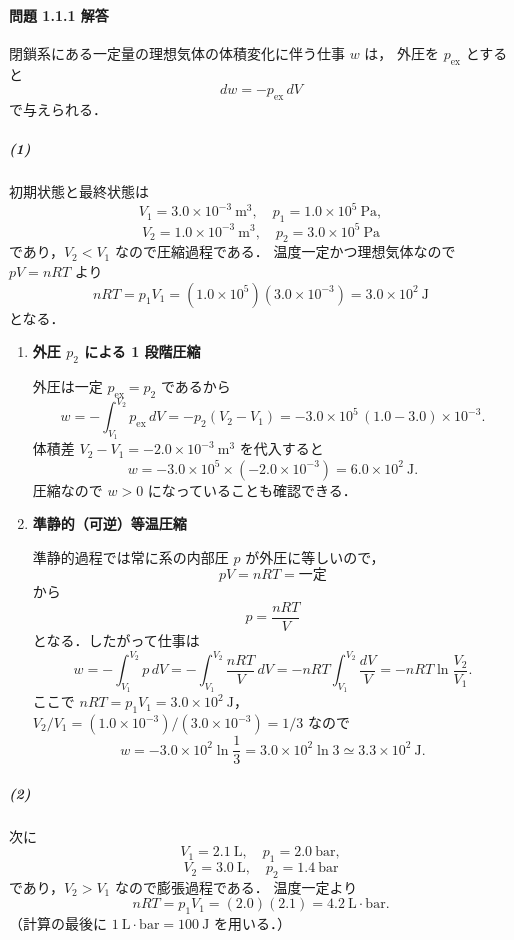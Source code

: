 \documentclass[a4paper,12pt]{jlreq}
\begin{document}
\paragraph{問題 1.1.1 解答}

閉鎖系にある一定量の理想気体の体積変化に伴う仕事 $w$ は，
外圧を $p_{\mathrm{ex}}$ とすると
\[
  dw = -p_{\mathrm{ex}}\,dV
\]
で与えられる．

\subparagraph{(1)}
初期状態と最終状態は
\[
  V_1 = 3.0\times 10^{-3}\ \mathrm{m^3},\quad
  p_1 = 1.0\times 10^{5}\ \mathrm{Pa},
\]
\[
  V_2 = 1.0\times 10^{-3}\ \mathrm{m^3},\quad
  p_2 = 3.0\times 10^{5}\ \mathrm{Pa}
\]
であり，$V_2<V_1$ なので圧縮過程である．
温度一定かつ理想気体なので $pV=nRT$ より
\[
  nRT = p_1 V_1 = (1.0\times10^{5})(3.0\times10^{-3})
  = 3.0\times10^{2}\ \mathrm{J}
\]
となる．

\begin{enumerate}
  \item[(i)] \textbf{外圧 $p_2$ による 1 段階圧縮}

  外圧は一定 $p_{\mathrm{ex}} = p_2$ であるから
  \[
    w = -\int_{V_1}^{V_2} p_{\mathrm{ex}}\,dV
      = -p_2(V_2-V_1)
      = -3.0\times10^{5}\,(1.0-3.0)\times10^{-3}.
  \]
  体積差 $V_2-V_1 = -2.0\times10^{-3}\ \mathrm{m^3}$ を代入すると
  \[
    w = -3.0\times10^{5}\times(-2.0\times10^{-3})
      = 6.0\times10^{2}\ \mathrm{J}.
  \]
  圧縮なので $w>0$ になっていることも確認できる．

  \item[(ii)] \textbf{準静的（可逆）等温圧縮}

  準静的過程では常に系の内部圧 $p$ が外圧に等しいので，
  \[
    pV = nRT = \text{一定}
  \]
  から
  \[
    p = \frac{nRT}{V}
  \]
  となる．したがって仕事は
  \[
    w = -\int_{V_1}^{V_2} p\,dV
      = -\int_{V_1}^{V_2} \frac{nRT}{V}\,dV
      = -nRT\int_{V_1}^{V_2} \frac{dV}{V}
      = -nRT \ln\frac{V_2}{V_1}.
  \]
  ここで $nRT = p_1V_1 = 3.0\times10^{2}\ \mathrm{J}$，
  \(
    V_2/V_1 = (1.0\times10^{-3})/(3.0\times10^{-3}) = 1/3
  \)
  なので
  \[
    w = -3.0\times10^{2}\ln\frac{1}{3}
      = 3.0\times10^{2}\ln 3
      \simeq 3.3\times10^{2}\ \mathrm{J}.
  \]
\end{enumerate}

\subparagraph{(2)}
次に
\[
  V_1 = 2.1\ \mathrm{L},\quad p_1 = 2.0\ \mathrm{bar},
\]
\[
  V_2 = 3.0\ \mathrm{L},\quad p_2 = 1.4\ \mathrm{bar}
\]
であり，$V_2>V_1$ なので膨張過程である．
温度一定より
\[
  nRT = p_1V_1 = (2.0)(2.1) = 4.2\ \mathrm{L\cdot bar}.
\]
（計算の最後に $1\ \mathrm{L\cdot bar}=100\ \mathrm{J}$ を用いる．）
\end{document}
